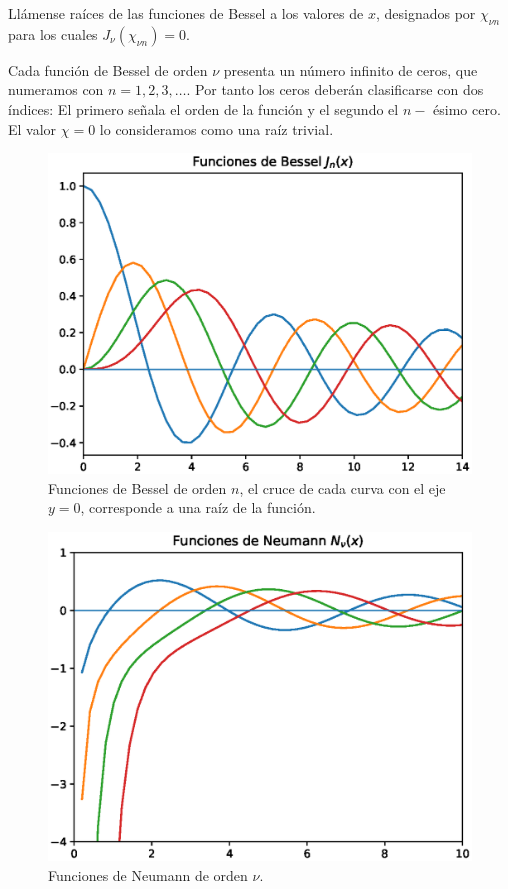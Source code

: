 Llámense raíces de las funciones de Bessel a los valores de $x$, designados por $\chi_{\nu n}$ para los cuales $J_{\nu} (\chi_{\nu n}) = 0$. 
\par
Cada función de Bessel de orden $\nu$ presenta un número infinito de ceros, que numeramos con $n = 1, 2, 3, \ldots$. Por tanto los ceros deberán clasificarse con dos índices: El primero señala el orden de la función y el segundo el $n-$ ésimo cero. El valor $\chi = 0$ lo consideramos como una raíz trivial.
\begin{figure}[H]
    \centering
    \includegraphics[scale=0.8]{Imagenes/plot_Bessel.eps}
    \caption{Funciones de Bessel de orden $n$, el cruce de cada curva con el eje $y=0$, corresponde a una raíz de la función.}
    \label{fig:figura_Bessel}
\end{figure}

\begin{figure}[H]
    \centering
    \includegraphics[scale=0.8]{Imagenes/plot_Neumann.eps}
    \caption{Funciones de Neumann de orden $\nu$.}
    \label{fig:figura_Neumann}
\end{figure}

